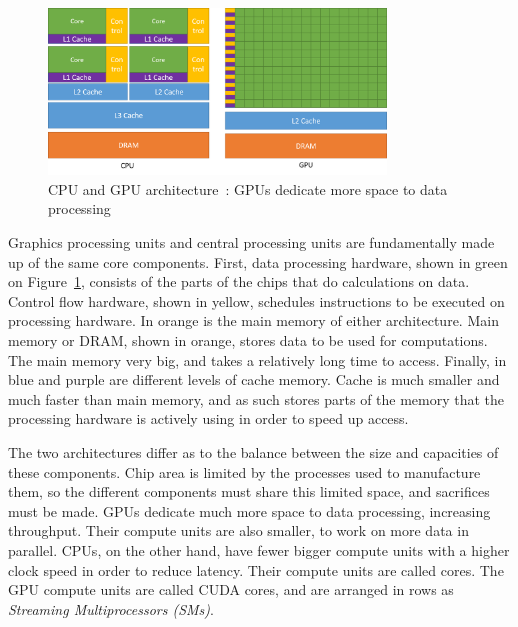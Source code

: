 \begin{figure}[H]
	\centering
	\includegraphics[width=0.8\textwidth]{Chapter_graphics_processing_units/media/gpu-devotes-more-transistors-to-data-processing}
	\caption{CPU and GPU architecture~\cite{Nvidia2021}: GPUs dedicate more space to data processing}
	\label{fig:cpu_gpu}
\end{figure}

Graphics processing units and central processing units are fundamentally made up of the same core
components. First, data processing hardware, shown in green on Figure~\ref{fig:cpu_gpu}, consists of
the parts of the chips that do calculations on data. Control flow hardware, shown in yellow,
schedules instructions to be executed on processing hardware. In orange is the main memory of either
architecture. Main memory or DRAM, shown in orange, stores data to be used for computations. The
main memory very big, and takes a relatively long time to access. Finally, in blue and purple are
different levels of cache memory. Cache is much smaller and much faster than main memory, and as
such stores parts of the memory that the processing hardware is actively using in order to speed up
access.

The two architectures differ as to the balance between the size and capacities of these components.
Chip area is limited by the processes used to manufacture them, so the different components must
share this limited space, and sacrifices must be made. GPUs dedicate much more space to data
processing, increasing throughput. Their compute units are also smaller, to work on more data in
parallel. CPUs, on the other hand, have fewer bigger compute units with a higher clock speed in
order to reduce latency. Their compute units are called cores. The GPU compute units are called CUDA
cores, and are arranged in rows as \textit{Streaming Multiprocessors (SMs)}.

